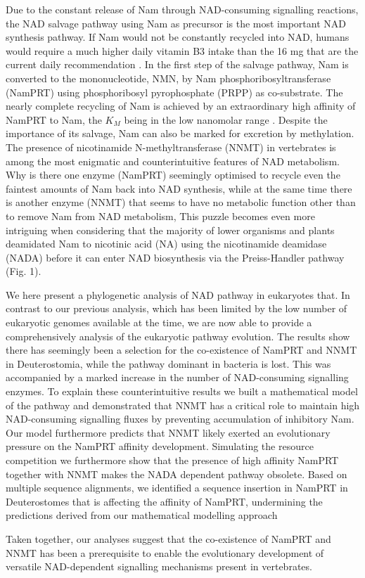Due to the constant release of Nam through NAD-consuming signalling reactions, the NAD salvage pathway using Nam as precursor is the most important NAD synthesis pathway. If Nam would not be constantly recycled into NAD, humans would require a much higher daily vitamin B3 intake than the 16 mg that are the current daily recommendation \cite{CommissionofEuropeanCommunities2008}. In the first step of the salvage pathway, Nam is converted to the mononucleotide, NMN, by Nam phosphoribosyltransferase (NamPRT) using phosphoribosyl pyrophosphate (PRPP) as co-substrate. The nearly complete recycling of Nam is achieved by an extraordinary high affinity of NamPRT to Nam, the $K_{M}$ being in the low nanomolar range \cite{Burgos2008}. Despite the importance of its salvage, Nam can also be marked for excretion by methylation. The presence of nicotinamide N-methyltransferase (NNMT) in vertebrates \cite{Gossmann2012FEBS} is among the most enigmatic and counterintuitive features of NAD metabolism. Why is there one enzyme (NamPRT) seemingly optimised to recycle even the faintest amounts of Nam back into NAD synthesis, while at the same time there is another enzyme (NNMT) that seems to have no metabolic function other than to remove Nam from NAD metabolism, This puzzle becomes even more intriguing when considering that the majority of lower organisms and plants deamidated Nam to nicotinic acid (NA) using the nicotinamide deamidase (NADA) before it can enter NAD biosynthesis via the Preiss-Handler pathway (Fig. 1).

We here present a phylogenetic analysis of NAD pathway in eukaryotes that. In contrast to our previous analysis, which has been limited by the low number of eukaryotic genomes available at the time, we are now able to provide a comprehensively analysis of the eukaryotic pathway evolution. The results show there has seemingly been a selection for the co-existence of NamPRT and NNMT in Deuterostomia, while the pathway dominant in bacteria is lost. This was accompanied by a marked increase in the number of NAD-consuming signalling enzymes. To explain these counterintuitive results we built a mathematical model of the pathway and demonstrated that NNMT has a critical role to maintain high NAD-consuming signalling fluxes by preventing accumulation of inhibitory Nam. Our model furthermore predicts that NNMT likely exerted an evolutionary pressure on the NamPRT affinity development. Simulating the resource competition we furthermore show that the presence of high affinity NamPRT together with NNMT makes the NADA dependent pathway obsolete. Based on multiple sequence alignments, we identified a sequence insertion in NamPRT in Deuterostomes that is affecting the affinity of NamPRT, undermining the predictions derived from our mathematical modelling approach

Taken together, our analyses suggest that the co-existence of NamPRT and NNMT has been a prerequisite to enable the evolutionary development of versatile NAD-dependent signalling mechanisms present in vertebrates.
